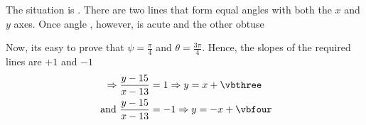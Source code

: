 \begin{solution}
	The situation is \asif. There are two lines that form equal angles with both the $x$ and $y$ axes. Once angle ,
    however, is acute and the other obtuse
    
    Now, its easy to prove that $\psi = \frac{\pi}{4}$ and $\theta = \frac{3\pi}{4}$. Hence, the slopes of the 
    required lines are $+1$ and $-1$
    \begin{align}
    	\Rightarrow \dfrac{y-\vbtwo}{x-\vbone} &= 1 \Rightarrow y = x + \vbthree\\
    	\text{ and } \dfrac{y-\vbtwo}{x-\vbone} &= -1 \Rightarrow y = -x + \vbfour
    \end{align}
\end{solution}

